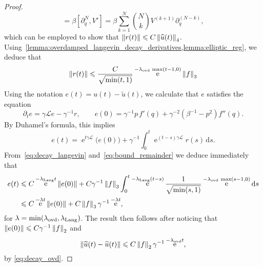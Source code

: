 \documentclass[11pt,a4paper]{article}
\DeclareMathOperator{\e}{e}
\newcommand{\commut}[2]{[#1, #2]}
\renewcommand{\d}{\mathrm d}
\theoremstyle{plain}
\numberwithin{equation}{section}
\renewcommand{\leq}{\leqslant}
\begin{document}
\begin{proof}
\begin{equation}
        = \beta \commut{\partial_q^N}{V'}
        = \beta \sum_{k=1}^{N} {N \choose k} V^{(k+1)} \partial_q^{(N-k)},
    \end{equation}
    which can be employed to show that $\norm{r(t)} \leq C \norm{\widehat u(t)}_4$.
    Using~\cref{lemma:overdamped_langevin_decay_derivatives,lemma:elliptic_reg},
    we deduce that
    \begin{align}
        \label{eq:bound_remainder}
        \norm{r(t)} \leq \frac{C}{\sqrt{\min(t, 1)}}  \e^{- \lambda_{\rm ovd} \, \max(t-1, 0)} \norm{f}[3]
    \end{align}
    Using the notation $e(t) = u(t) - \widetilde u(t)$,
    we calculate that $e$ satisfies the equation
    \[
        \partial_t e = \gamma \mathcal L e - \gamma^{-1} r, \qquad
        e(0) = \gamma^{-1} p \, f'(q) + \gamma^{-2} (\beta^{-1} - p^2) f''(q).
    \]
    By Duhamel's formula,
    this implies
    \[
        e(t) = \e^{t \gamma \mathcal L} \bigl( e(0) \bigr) + \gamma^{-1} \int_{0}^{t} \e^{(t- s) \gamma \mathcal L} r(s) \, \d s.
    \]
    From~\eqref{eq:decay_langevin} and~\eqref{eq:bound_remainder} we deduce immediately that
    \begin{align*}
        e(t)
        &\leq C \e^{- \lambda_{\rm Lang} t} \norm{e(0)}
        + C \gamma^{-1} \norm{f}[3] \int_{0}^{t} \e^{- \lambda_{\rm Lang} (t-s)} \frac{1}{\sqrt{\min(s, 1)}}  \e^{- \lambda_{\rm ovd} \, \max(s-1, 0)} \d s \\
        &\leq C \e^{- \lambda t} \norm{e(0)} + C \norm{f}_3 \gamma^{-1} \e^{- \lambda t},
    \end{align*}
    for $\lambda = \min(\lambda_{\rm ovd}, \lambda_{\rm Lang})$.
    The result then follows after noticing that $\norm{e(0)} \leq C \gamma^{-1} \norm{f}_2$ and
    \[
        \norm{\widetilde u(t) - \widehat u(t)} \leq C \norm{f}_2 \gamma^{-1} \e^{- \lambda_{\rm ovd} t},
    \]
    by \eqref{eq:decay_ovd}.
\end{proof}
\end{document}
